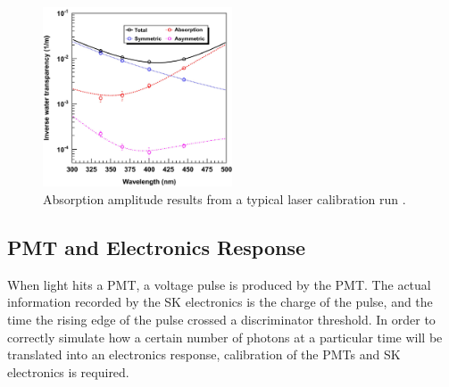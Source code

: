 \begin{figure}
\centering
\includegraphics[width=0.5\textwidth]{figures/Water_transperency.png}
\caption{Absorption amplitude results from a typical laser calibration run \cite{Abe:2013gga}.}
\label{fig:water_transparency_results}
\end{figure}

\subsection{PMT and Electronics Response}
When light hits a PMT, a voltage pulse is produced by the PMT.  The actual information recorded by the SK electronics is the charge of the pulse, and the time the rising edge of the pulse crossed a discriminator threshold.  In order to correctly simulate how a certain number of photons at a particular time will be translated into an electronics response, calibration of the PMTs and SK electronics is required.\par
